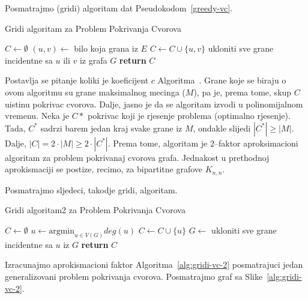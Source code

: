 \documentclass[a4paper, utf8, 11pt, colorlinks]{article}
\begin{document}
  
  Posmatrajmo (gridi) algoritam dat Pseudokodom~\ref{greedy-vc}. 
  
  \begin{algorithm}[!t] 
  	\caption{Gridi algoritam za Problem Pokrivanja Cvorova}\label{alg:gridi-vc}
  	\begin{algorithmic}[1]
  		\STATE $C \gets \emptyset$
  		\STATE $(u,v) \gets$ bilo koja grana iz $E$
  		\STATE $C \gets C \cup \{u,v\}$
  		\STATE ukloniti sve grane incidentne sa  $u$ ili $v$ iz grafa $G$
  		\ENDWHILE
  		\STATE \textbf{return} $C$
  	\end{algorithmic}
  \end{algorithm}
  
  \noindent Postavlja se pitanje koliki je koeficijent $c$ Algoritma~\label{alg:gridi-vc}.
  Grane koje se biraju o ovom algoritmu su grane maksimalnog mecinga ($M$), pa je, prema tome, skup $C$ uistinu pokrivac cvorova.
  Dalje, jasno je da se algoritam izvodi u polinomijalnom vremenu. Neka je $C*$ pokrivac koji je rjesenje problema (optimalno rjesenje). Tada, $C^*$ sadrzi barem jedan kraj svake grane iz $M$, ondakle slijedi $|C^*|\geq |M|$. Dalje, $|C|= 2 \cdot |M| \geq 2 \cdot |C^*|$. Prema tome, algoritam je $2$--faktor aproksimacioni algoritam za problem pokrivanaj cvorova grafa.
  Jednakost u prethodnoj aprokismaciji se postize, recimo, za bipartitne grafove $K_{n,n}$. 
  
  Posmatrajmo sljedeci, takodje gridi, algoritam. 
  
  \begin{algorithm}[!t] 
  	\caption{Gridi algoritam2 za Problem Pokrivanja Cvorova}\label{alg:gridi-vc-2}
  	\begin{algorithmic}[1]
  		\STATE $C \gets \emptyset$
  		\STATE  $u \gets \textrm{argmin}_{u \in V(G)} deg(u)$
  		\STATE  $C \gets C \cup \{u\}$
  		\STATE $G \gets$ ukloniti sve grane incidentne sa $u$ iz $G$  
  		\ENDWHILE
  		\STATE \textbf{return} $C$
  	\end{algorithmic}
  \end{algorithm}
  
  \noindent Izracunajmo aprokismacioni faktor Algoritma~\ref{alg:gridi-vc-2} posmatrajuci jedan generalizovani problem pokrivanja cvorova. Posmatrajmo graf sa Slike~\ref{alg:gridi-vc-2}. 
  
\end{document}
